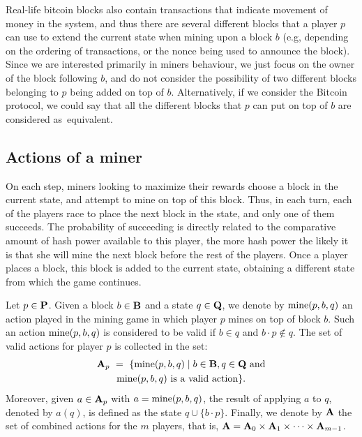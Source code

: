 Real-life bitcoin blocks also contain transactions that indicate movement of money in the system, and thus there are 
several different blocks that a player $p$ can use to extend the current state when mining upon a block $b$ (e.g, depending  on the ordering of transactions, or the nonce being used to announce the block). Since we are interested primarily in miners behaviour, we just focus on the owner of the block following $b$, and do not consider the possibility of two different blocks belonging to $p$ being added on top of $b$. Alternatively, if we consider the Bitcoin protocol, we could say that all the different blocks that $p$ can put on top of $b$ are considered as~equivalent. 

\subsection{Actions of a miner}
On each step, miners looking to maximize their rewards choose a block in the current state, and attempt to mine on top of this block. Thus, in each turn, each of the players race to place the next block in the state, and only one of them succeeds. The probability of succeeding is directly related to the comparative amount of hash power available to this player, the more hash power the likely it is that she will mine the next block before the rest of the players. Once a player places a block, this block is added to the current state, obtaining a different state from which the game continues.

Let $p \in \mathbf{P}$. Given a block $b \in \mathbf{B}$ and a state $q \in \mathbf{Q}$, we denote by $\text{\rm mine}(p,b,q)$ an action played in the mining game in which player $p$ mines on top of block $b$. Such an action $\text{\rm mine}(p,b,q)$ is considered to be valid if $b \in q$ and $b\cdot p \not\in q$. The set of valid actions for player $p$ is collected in the set:
\begin{multline*}
\mathbf{A}_p \ = \ \{ \text{\rm mine}(p,b,q) \mid b \in \mathbf{B}, q \in \mathbf{Q} \text{ and}\\\text{\rm mine}(p,b,q) \text{ is a valid action}\}.
\end{multline*}
Moreover, given $a \in \mathbf{A}_p$ with $a = \text{\rm mine}(p,b,q)$, the result of applying $a$ to $q$, denoted by $a(q)$, is defined as the state $q \cup \{b \cdot p\}$. Finally, we denote by $\mathbf{A}$ the set of combined actions for the $m$ players, that is, $\mathbf{A} = \mathbf{A}_0 \times \mathbf{A}_1 \times \cdots \times \mathbf{A}_{m-1}$.


